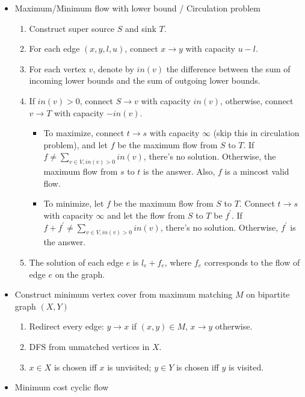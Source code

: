 \begin{itemize}
    \item Maximum/Minimum flow with lower bound / Circulation problem
      \begin{enumerate}
        \item Construct super source $S$ and sink $T$.
        \item For each edge $(x, y, l, u)$, connect $x \rightarrow y$ with capacity $u - l$.
        \item For each vertex $v$, denote by $in(v)$ the difference between the sum of incoming lower bounds and the sum of outgoing lower bounds.
        \item If $in(v) > 0$, connect $S \rightarrow v$ with capacity $in(v)$, otherwise, connect $v \rightarrow T$ with capacity $-in(v)$.
          \begin{itemize}
            \item To maximize, connect $t \rightarrow s$ with capacity $\infty$ (skip this in circulation problem), and let $f$ be the maximum flow from $S$ to $T$. If $f \neq \sum_{v \in V, in(v) > 0}{in(v)}$, there's no solution. Otherwise, the maximum flow from $s$ to $t$ is the answer. Also, $f$ is a mincost valid flow.
            \item To minimize, let $f$ be the maximum flow from $S$ to $T$. Connect $t \rightarrow s$ with capacity $\infty$ and let the flow from $S$ to $T$ be $f^\prime$. If $f + f^\prime \neq \sum_{v \in V, in(v) > 0}{in(v)}$, there's no solution. Otherwise, $f^\prime$ is the answer.
          \end{itemize}
        \item The solution of each edge $e$ is $l_e + f_e$, where $f_e$ corresponds to the flow of edge $e$ on the graph.
      \end{enumerate}
    \item Construct minimum vertex cover from maximum matching $M$ on bipartite graph $(X, Y)$
      \begin{enumerate}
        \item Redirect every edge: $y \rightarrow x$ if $(x, y) \in M$, $x \rightarrow y$ otherwise.
        \item DFS from unmatched vertices in $X$.
        \item $x \in X$ is chosen iff $x$ is unvisited; $y \in Y$ is chosen iff $y$ is visited.
      \end{enumerate}
    \item Minimum cost cyclic flow
      \begin{enumerate}

\end{enumerate}
\end{itemize}

